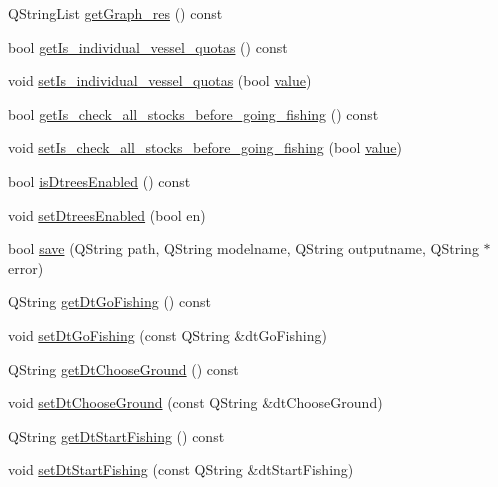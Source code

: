 \begin{DoxyCompactItemize}
\item 
Q\+String\+List \mbox{\hyperlink{class_scenario_a0d09811857de200d557e566750487a0e}{get\+Graph\+\_\+res}} () const
\item 
bool \mbox{\hyperlink{class_scenario_a38807577d600d695c284220c3958723d}{get\+Is\+\_\+individual\+\_\+vessel\+\_\+quotas}} () const
\item 
void \mbox{\hyperlink{class_scenario_a5b8d92263269e78cde20c359470dfed9}{set\+Is\+\_\+individual\+\_\+vessel\+\_\+quotas}} (bool \mbox{\hyperlink{diffusion_8cpp_a4b41795815d9f3d03abfc739e666d5da}{value}})
\item 
bool \mbox{\hyperlink{class_scenario_af519376962d6252ed73cacf2f4832db2}{get\+Is\+\_\+check\+\_\+all\+\_\+stocks\+\_\+before\+\_\+going\+\_\+fishing}} () const
\item 
void \mbox{\hyperlink{class_scenario_a93b19cdb80507664708a0902db15805c}{set\+Is\+\_\+check\+\_\+all\+\_\+stocks\+\_\+before\+\_\+going\+\_\+fishing}} (bool \mbox{\hyperlink{diffusion_8cpp_a4b41795815d9f3d03abfc739e666d5da}{value}})
\item 
bool \mbox{\hyperlink{class_scenario_a541ebfa94819366f647ae5b4be6a4ad6}{is\+Dtrees\+Enabled}} () const
\item 
void \mbox{\hyperlink{class_scenario_a674c4740bd0475c0d24f08458e4db330}{set\+Dtrees\+Enabled}} (bool en)
\item 
bool \mbox{\hyperlink{class_scenario_a3b2b03b282763b6b245c40815acbc1a0}{save}} (Q\+String path, Q\+String modelname, Q\+String outputname, Q\+String $\ast$error)
\item 
Q\+String \mbox{\hyperlink{class_scenario_a583b9e7a2b47ec53c0911442727cad97}{get\+Dt\+Go\+Fishing}} () const
\item 
void \mbox{\hyperlink{class_scenario_afdf8837d1488f5ab6ddb33f5bb0681c5}{set\+Dt\+Go\+Fishing}} (const Q\+String \&dt\+Go\+Fishing)
\item 
Q\+String \mbox{\hyperlink{class_scenario_a2e0da0c09af9594ac0b7638a8c2c4945}{get\+Dt\+Choose\+Ground}} () const
\item 
void \mbox{\hyperlink{class_scenario_a5bb2f11187fd4182521fac15f84ed1ce}{set\+Dt\+Choose\+Ground}} (const Q\+String \&dt\+Choose\+Ground)
\item 
Q\+String \mbox{\hyperlink{class_scenario_a108d4ff35984d4ef397706dbf94917f1}{get\+Dt\+Start\+Fishing}} () const
\item 
void \mbox{\hyperlink{class_scenario_ab7539e9352b121a896d9e149a1e27ff0}{set\+Dt\+Start\+Fishing}} (const Q\+String \&dt\+Start\+Fishing)

\end{DoxyCompactItemize}
